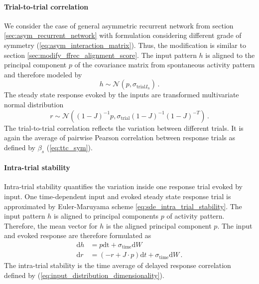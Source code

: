 \documentclass[11pt]{article}
\begin{document}
	\paragraph{Trial-to-trial correlation} We consider the case of general asymmetric recurrent network from section \ref{sec:asym_recurrent_network} with formulation considering different grade of symmetry (\ref{eq:asym_interaction_matrix}). Thus, the modification is similar to section \ref{sec:modify_ffrec_alignment_score}. The input pattern $h$ is aligned to the principal component $p$ of the covariance matrix from spontaneous activity pattern and therefore modeled by
		\begin{equation}
			h \sim \mathcal{N}(p, \sigma_{\text{trial}I_n}) \, .
		\end{equation}
	The steady state response evoked by the inputs are transformed multivariate normal distribution
		\begin{equation}
			r \sim \mathcal{N}\left((1-J)^{-1}p, \sigma_{\text{trial}} (1-J)^{-1} (1-J)^{-T}\right) \, .
		\end{equation}
	The trial-to-trial correlation reflects the variation between different trials. It is again the average of pairwise Pearson correlation between response trials as defined by $\beta_s$ (\ref{eq:ttc_sym}). 
	
	\paragraph{Intra-trial stability} Intra-trial stability quantifies the variation inside one response trial evoked by input. One time-dependent input and evoked steady state response trial is approximated by Euler-Maruyama scheme \ref{eq:sde_intra_trial_stability}. The input pattern $h$ is aligned to principal components $p$ of activity pattern. Therefore, the mean vector for $h$ is the aligned principal component $p$. The input and evoked response are therefore formulated as
		\begin{subequations}
			\begin{align}
				\mathrm{d} h & = p \mathrm{dt} + \sigma_{\text{time}} \mathrm{d} W \\
				\mathrm{d} r & = (-r + J \cdot p) \mathrm{d}t + \sigma_{\text{time}} \mathrm{d} W \, .
			\end{align}
		\end{subequations}
	The intra-trial stability is the time average of delayed response correlation defined by (\ref{eq:input_distribution_dimensionality}). 
	
\end{document}
